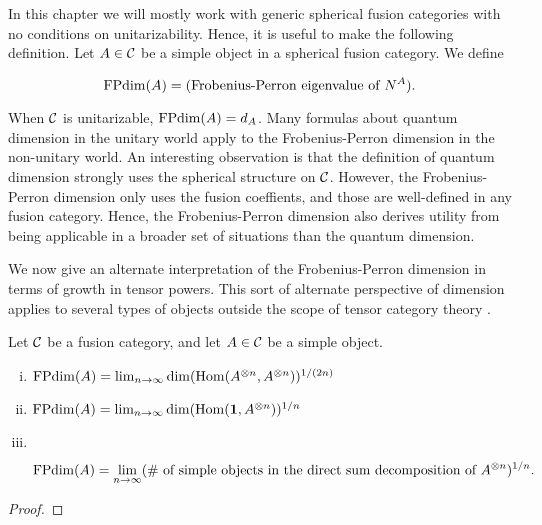 In this chapter we will mostly work with generic spherical fusion categories with no conditions on unitarizability. Hence, it is useful to make the following definition. Let $A\in{\mathcal C}$ be a simple object in a spherical fusion category. We define

$$\operatorname{FPdim}(A)=(\text{Frobenius-Perron eigenvalue of $N^A$}).$$

When ${\mathcal C}$ is unitarizable, $\operatorname{FPdim}(A)=d_A$. Many formulas about quantum dimension in the unitary world apply to the Frobenius-Perron dimension in the non-unitary world. An interesting observation is that the definition of quantum dimension strongly uses the spherical structure on ${\mathcal C}$. However, the Frobenius-Perron dimension only uses the fusion coeffients, and those are well-defined in any fusion category. Hence, the Frobenius-Perron dimension also derives utility from being applicable in a broader set of situations than the quantum dimension.

We now give an alternate interpretation of the Frobenius-Perron dimension in terms of growth in tensor powers. This sort of alternate perspective of dimension applies to several types of objects outside the scope of tensor category theory \cite{coulembier2024growth}.

\begin{prop} Let ${\mathcal C}$ be a fusion category, and let $A\in {\mathcal C}$ be a simple object.

\begin{enumerate}[(i)]
\item $\operatorname{FPdim}(A)=\lim_{n\to\infty}\dim(\operatorname{Hom}(A^{\otimes n},A^{\otimes n}))^{1/(2n)}$
\item $\operatorname{FPdim}(A)=\lim_{n\to\infty}\dim(\operatorname{Hom}({\mathbf 1},A^{\otimes n}))^{1/n}$
\item $\,$

$$\operatorname{FPdim}(A)=\lim_{n\to\infty}(\text{\# of simple objects in the direct sum decomposition of $A^{\otimes n}$})^{1/n}.$$
\end{enumerate}
\end{prop}
\begin{proof}
\end{proof}

